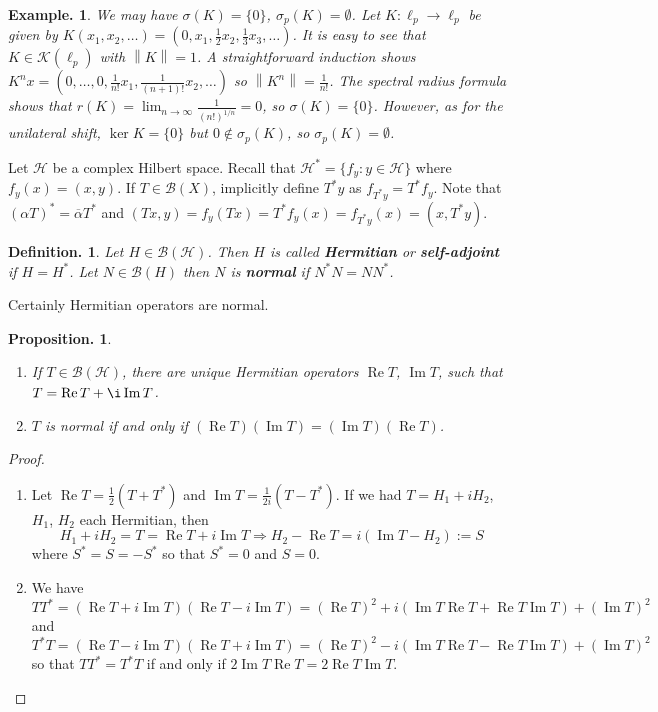 \documentclass[11pt, a4paper]{memoir}
\newcommand{\norm}[1]{\ensuremath{\left\lVert#1\right\rVert}}
\theoremstyle{change}
\newtheorem{proposition}[theorem]{Proposition.}
\theoremstyle{plain}
\theoremstyle{nonumberplain}
\newtheorem{definition}{Definition.}
\newtheorem{example}{Example.}
\newtheorem{proof}{Proof}
\renewcommand{\Re}{\ensuremath{\operatorname{Re}}}
\renewcommand{\Im}{\ensuremath{\operatorname{Im}}}
\newcommand{\inr}[1]{\ensuremath{\left(#1\right)}}
\numberwithin{equation}{section}
\begin{document}
\begin{example}
    We may have $\sigma(K)=\{0\}$, $\sigma_p(K)=\emptyset$.
    Let $K:\ell_p\to\ell_p$ be given by $K(x_1,x_2,\ldots)=(0,x_1,\frac{1}{2}x_2,\frac{1}{3}x_3,\ldots)$.
    It is easy to see that $K\in\mathcal{K}(\ell_p)$ with $\norm{K}=1$.
    A straightforward induction shows $K^nx=(0,\ldots,0,\frac{1}{n!}x_1,\frac{1}{(n+1)!}x_2,\ldots)$ so $\norm{K^n}=\frac{1}{n!}$.
    The spectral radius formula shows that $r(K)=\lim_{n\to\infty}\frac{1}{(n!)^{1/n}}=0$, so $\sigma(K)=\{0\}$.
    However, as for the unilateral shift, $\ker K=\{0\}$ but $0\notin\sigma_p(K)$, so $\sigma_p(K)=\emptyset$.
\end{example}
Let $\mathcal{H}$ be a complex Hilbert space.
Recall that $\mathcal{H}^*=\{f_y:y\in\mathcal{H}\}$ where $f_y(x)=\inr{x,y}$.
If $T\in\mathcal{B}(X)$, implicitly define $T^*y$ as $f_{T^*y}=T^*f_y$.
Note that $(\alpha T)^*=\overline{\alpha}T^*$ and $\inr{Tx,y}=f_y(Tx)=T^*f_y(x)=f_{T^*y}(x)=\inr{x,T^*y}$.
\begin{definition}
    Let $H\in\mathcal{B}(\mathcal{H})$.
    Then $H$ is called \textbf{Hermitian} or \textbf{self-adjoint} if $H=H^*$.
    Let $N\in\mathcal{B}(H)$ then $N$ is \textbf{normal} if $N^*N=NN^*$.
\end{definition}
Certainly Hermitian operators are normal.
\begin{proposition}
    \begin{enumerate}[nl,r]
        \item If $T\in\mathcal{B}(\mathcal{H})$, there are unique Hermitian operators $\Re T$, $\Im T$, such that $T=\Re T+\i\Im T$.
        \item $T$ is normal if and only if $(\Re T)(\Im T)=(\Im T)(\Re T)$.
    \end{enumerate}
\end{proposition}
\begin{proof}
    \begin{enumerate}[nl,r]
        \item Let $\Re T=\frac{1}{2}(T+T^*)$ and $\Im T=\frac{1}{2i}(T-T^*)$.
            If we had $T=H_1+iH_2$, $H_1$, $H_2$ each Hermitian, then
            \begin{equation*}
                H_1+iH_2=T=\Re T+i\Im T\Longrightarrow H_2-\Re T=i(\Im T-H_2):=S
            \end{equation*}
            where $S^*=S=-S^*$ so that $S^*=0$ and $S=0$.
        \item We have
            \begin{equation*}
                TT^*=(\Re T+i\Im T)(\Re T-i\Im T)=(\Re T)^2+i(\Im T\Re T+\Re T\Im T)+(\Im T)^2
            \end{equation*}
            and
            \begin{equation*}
                T^*T=(\Re T-i\Im T)(\Re T+i\Im T)=(\Re T)^2-i(\Im T\Re T-\Re T\Im T)+(\Im T)^2
            \end{equation*}
            so that $TT^*=T^*T$ if and only if $2\Im T\Re T=2\Re T\Im T$.
    \end{enumerate}
\end{proof}
\end{document}
